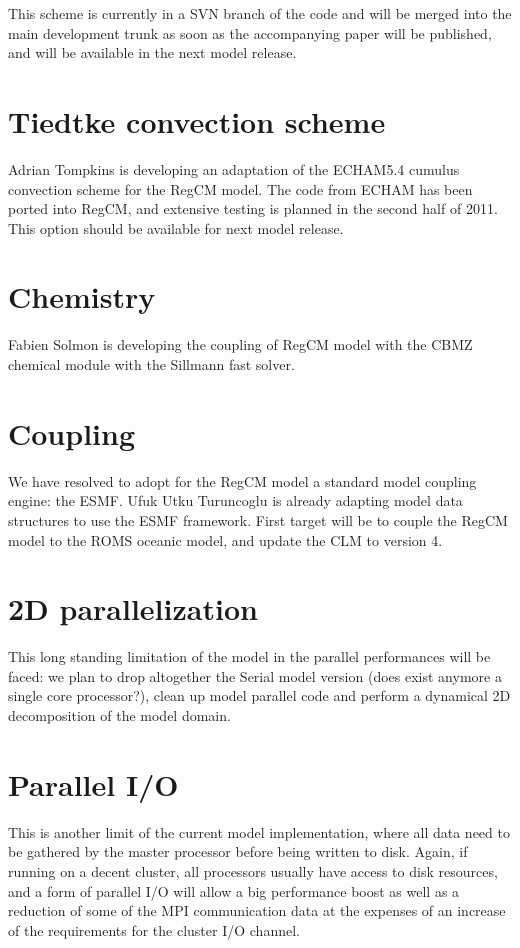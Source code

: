 This scheme is currently in a SVN branch of the code and will be merged into
the main development trunk as soon as the accompanying paper will be published,
and will be available in the next model release.

\section{Tiedtke convection scheme}

Adrian Tompkins is developing an adaptation of the ECHAM5.4 \cite{Tiedtke_89}
cumulus convection scheme for the \ac{RegCM} model. The code from ECHAM has
been ported into RegCM, and extensive testing is planned in the second half of
2011. This option should be available for next model release.

\section{Chemistry}

Fabien Solmon is developing the coupling of \ac{RegCM} model with the CBMZ
chemical module with the Sillmann fast solver.

\section{Coupling}

We have resolved to adopt for the \ac{RegCM} model a standard model coupling
engine: the \ac{ESMF}. Ufuk Utku Turuncoglu is already adapting model data
structures to use the \ac{ESMF} framework. First target will be to couple
the \ac{RegCM} model to the \ac{ROMS} oceanic model, and update the \ac{CLM}
to version 4.

\section{2D parallelization}

This long standing limitation of the model in the parallel performances will
be faced: we plan to drop altogether the Serial model version (does exist
anymore a single core processor?), clean up model parallel code and perform
a dynamical 2D decomposition of the model domain.

\section{Parallel I/O}

This is another limit of the current model implementation, where all data
need to be gathered by the master processor before being written to disk.
Again, if running on a decent cluster, all processors usually have access
to disk resources, and a form of parallel I/O will allow a big performance
boost as well as a reduction of some of the MPI communication data at the
expenses of an increase of the requirements for the cluster I/O channel.

